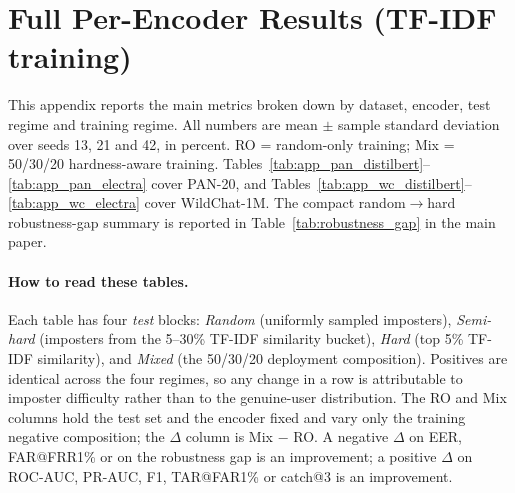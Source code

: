 \documentclass[11pt]{article}
\renewcommand{\arraystretch}{1.05}
\begin{document}
\clearpage
\appendix

\raggedbottom
\captionsetup[table]{skip=3pt}
\renewcommand{\arraystretch}{0.85}
\setlength{\tabcolsep}{3pt}
\setcounter{topnumber}{4}
\setcounter{bottomnumber}{2}
\setcounter{totalnumber}{6}
\renewcommand{\topfraction}{0.95}
\renewcommand{\bottomfraction}{0.85}
\renewcommand{\textfraction}{0.05}
\renewcommand{\floatpagefraction}{0.80}
\makeatletter
\setlength{\@fptop}{0pt}
\setlength{\@dblfptop}{0pt}
\setlength{\@fpbot}{0pt plus 1fil}
\setlength{\@dblfpbot}{0pt plus 1fil}
\makeatother

\section{Full Per-Encoder Results (TF-IDF training)}
\label{sec:appendix_full}

This appendix reports the main metrics broken down by dataset, encoder, test regime and training regime. All numbers are mean $\pm$ sample standard deviation over seeds 13, 21 and 42, in percent. RO = random-only training; Mix = 50/30/20 hardness-aware training. Tables~\ref{tab:app_pan_distilbert}--\ref{tab:app_pan_electra} cover PAN-20, and Tables~\ref{tab:app_wc_distilbert}--\ref{tab:app_wc_electra} cover WildChat-1M. The compact random$\to$hard robustness-gap summary is reported in Table~\ref{tab:robustness_gap} in the main paper.

\paragraph{How to read these tables.} Each table has four \emph{test} blocks: \emph{Random} (uniformly sampled imposters), \emph{Semi-hard} (imposters from the 5--30\% TF-IDF similarity bucket), \emph{Hard} (top 5\% TF-IDF similarity), and \emph{Mixed} (the 50/30/20 deployment composition). Positives are identical across the four regimes, so any change in a row is attributable to imposter difficulty rather than to the genuine-user distribution. The RO and Mix columns hold the test set and the encoder fixed and vary only the training negative composition; the $\Delta$ column is Mix $-$ RO. A negative $\Delta$ on EER, FAR@FRR1\% or on the robustness gap is an improvement; a positive $\Delta$ on ROC-AUC, PR-AUC, F1, TAR@FAR1\% or catch@3 is an improvement.
\end{document}
